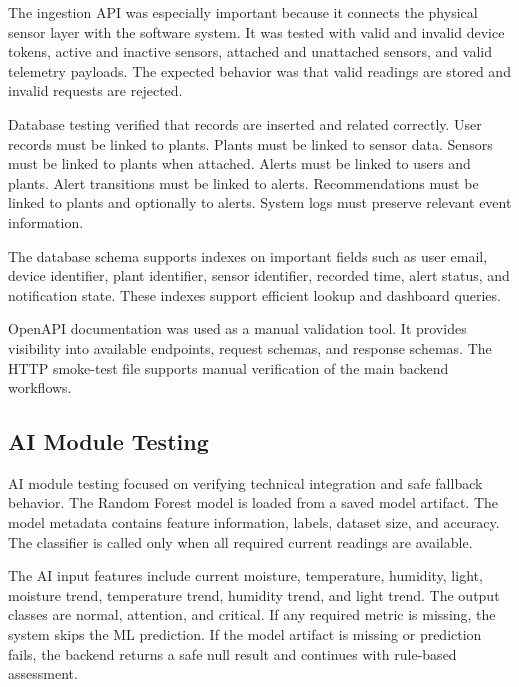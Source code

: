 The ingestion API was especially important because it connects the physical sensor layer with the software system. It was tested with valid and invalid device tokens, active and inactive sensors, attached and unattached sensors, and valid telemetry payloads. The expected behavior was that valid readings are stored and invalid requests are rejected.

Database testing verified that records are inserted and related correctly. User records must be linked to plants. Plants must be linked to sensor data. Sensors must be linked to plants when attached. Alerts must be linked to users and plants. Alert transitions must be linked to alerts. Recommendations must be linked to plants and optionally to alerts. System logs must preserve relevant event information.

The database schema supports indexes on important fields such as user email, device identifier, plant identifier, sensor identifier, recorded time, alert status, and notification state. These indexes support efficient lookup and dashboard queries.

OpenAPI documentation was used as a manual validation tool. It provides visibility into available endpoints, request schemas, and response schemas. The HTTP smoke-test file supports manual verification of the main backend workflows.

\subsection{AI Module Testing}
\label{subsec:ai-module-testing}

AI module testing focused on verifying technical integration and safe fallback behavior. The Random Forest model is loaded from a saved model artifact. The model metadata contains feature information, labels, dataset size, and accuracy. The classifier is called only when all required current readings are available.

The AI input features include current moisture, temperature, humidity, light, moisture trend, temperature trend, humidity trend, and light trend. The output classes are normal, attention, and critical. If any required metric is missing, the system skips the ML prediction. If the model artifact is missing or prediction fails, the backend returns a safe null result and continues with rule-based assessment.

